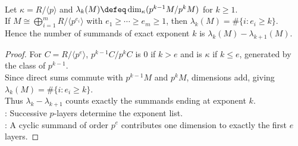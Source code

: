 \begin{proposition} \label{prop:p-primary-layer-counts-recover-exponents} \\
Let $\kappa=R/\langle p\rangle$ and $\lambda_k(M)\defeq\dim_{\kappa}(p^{k-1}M/p^kM)$ for $k\geq1$.\\
If $M\cong\bigoplus\limits_{i=1}^mR/\langle p^{e_i}\rangle$ with $e_1\geq\cdots\geq e_m\geq1$, then $\lambda_k(M)=\#\{i:e_i\geq k\}$.\\
Hence the number of summands of exact exponent $k$ is $\lambda_k(M)-\lambda_{k+1}(M)$.
\begin{proof} For $C=R/\langle p^e\rangle$, $p^{k-1}C/p^kC$ is $0$ if $k>e$ and is $\kappa$ if $k\leq e$, generated by the class of $p^{k-1}$.\\
Since direct sums commute with $p^{k-1}M$ and $p^kM$, dimensions add, giving $\lambda_k(M)=\#\{i:e_i\geq k\}$.\\
Thus $\lambda_k-\lambda_{k+1}$ counts exactly the summands ending at exponent $k$.\\
: Successive $p$-layers determine the exponent list.\\
: A cyclic summand of order $p^e$ contributes one dimension to exactly the first $e$ layers.
\end{proof}
\end{proposition}
